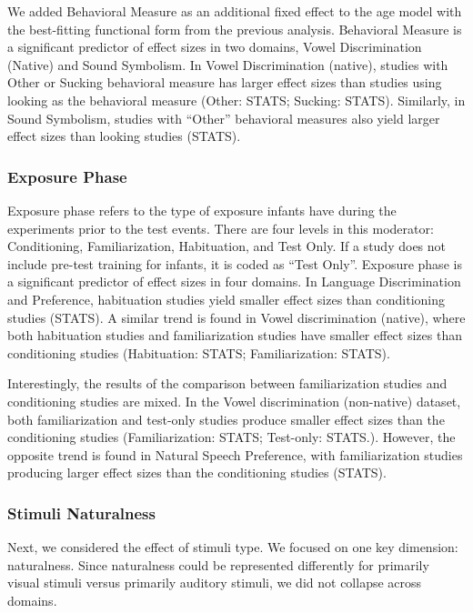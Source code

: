 \documentclass[10pt, letterpaper]{article}
\begin{document}
We added Behavioral Measure as an additional fixed effect to the age
model with the best-fitting functional form from the previous analysis.
Behavioral Measure is a significant predictor of effect sizes in two
domains, Vowel Discrimination (Native) and Sound Symbolism. In Vowel
Discrimination (native), studies with Other or Sucking behavioral
measure has larger effect sizes than studies using looking as the
behavioral measure (Other: STATS; Sucking: STATS). Similarly, in Sound
Symbolism, studies with ``Other'' behavioral measures also yield larger
effect sizes than looking studies (STATS).

\hypertarget{exposure-phase}{%
\subsubsection{Exposure Phase}\label{exposure-phase}}

Exposure phase refers to the type of exposure infants have during the
experiments prior to the test events. There are four levels in this
moderator: Conditioning, Familiarization, Habituation, and Test Only. If
a study does not include pre-test training for infants, it is coded as
``Test Only''. Exposure phase is a significant predictor of effect sizes
in four domains. In Language Discrimination and Preference, habituation
studies yield smaller effect sizes than conditioning studies (STATS). A
similar trend is found in Vowel discrimination (native), where both
habituation studies and familiarization studies have smaller effect
sizes than conditioning studies (Habituation: STATS; Familiarization:
STATS).

Interestingly, the results of the comparison between familiarization
studies and conditioning studies are mixed. In the Vowel discrimination
(non-native) dataset, both familiarization and test-only studies produce
smaller effect sizes than the conditioning studies (Familiarization:
STATS; Test-only: STATS.). However, the opposite trend is found in
Natural Speech Preference, with familiarization studies producing larger
effect sizes than the conditioning studies (STATS).

\hypertarget{stimuli-naturalness}{%
\subsubsection{Stimuli Naturalness}\label{stimuli-naturalness}}

Next, we considered the effect of stimuli type. We focused on one key
dimension: naturalness. Since naturalness could be represented
differently for primarily visual stimuli versus primarily auditory
stimuli, we did not collapse across domains.
\end{document}
